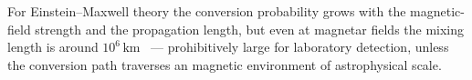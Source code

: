 For Einstein--Maxwell theory the conversion probability grows
with the magnetic-field strength and the propagation length,
but even at magnetar fields the mixing length is around
$10^6\,\mathrm{km}$~\cite{palessandro2023simple} --- prohibitively
large for laboratory detection, unless the conversion path traverses an
magnetic environment of astrophysical scale.

